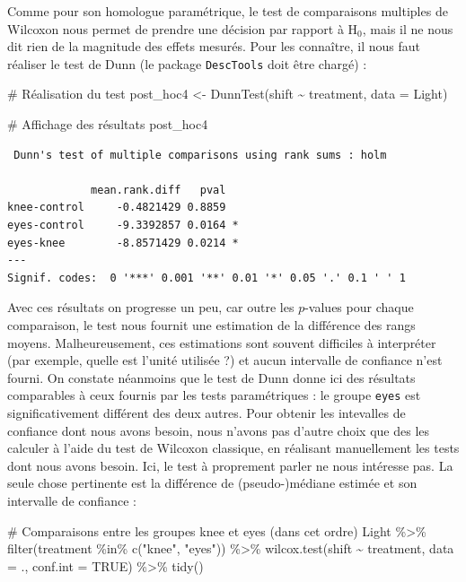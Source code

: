 \documentclass[
  a4paper,
]{article}
\newenvironment{Shaded}{\begin{snugshade}}{\end{snugshade}}
\newcommand{\AttributeTok}[1]{\textcolor[rgb]{0.00,0.34,0.68}{#1}}
\newcommand{\CommentTok}[1]{\textcolor[rgb]{0.54,0.53,0.53}{#1}}
\newcommand{\ConstantTok}[1]{\textcolor[rgb]{0.67,0.33,0.00}{#1}}
\newcommand{\FunctionTok}[1]{\textcolor[rgb]{0.39,0.29,0.61}{#1}}
\newcommand{\NormalTok}[1]{\textcolor[rgb]{0.12,0.11,0.11}{#1}}
\newcommand{\OtherTok}[1]{\textcolor[rgb]{0.00,0.43,0.16}{#1}}
\newcommand{\SpecialCharTok}[1]{\textcolor[rgb]{0.24,0.68,0.91}{#1}}
\newcommand{\StringTok}[1]{\textcolor[rgb]{0.75,0.01,0.01}{#1}}
\begin{document}
Comme pour son homologue paramétrique, le test de comparaisons multiples de Wilcoxon nous permet de prendre une décision par rapport à H\(_0\), mais il ne nous dit rien de la magnitude des effets mesurés. Pour les connaître, il nous faut réaliser le test de Dunn (le package \texttt{DescTools} doit être chargé) :

\begin{Shaded}
\begin{Highlighting}[]
\CommentTok{\# Réalisation du test}
\NormalTok{post\_hoc4 }\OtherTok{\textless{}{-}} \FunctionTok{DunnTest}\NormalTok{(shift }\SpecialCharTok{\textasciitilde{}}\NormalTok{ treatment, }\AttributeTok{data =}\NormalTok{ Light)}

\CommentTok{\# Affichage des résultats}
\NormalTok{post\_hoc4}
\end{Highlighting}
\end{Shaded}

\begin{verbatim}
 Dunn's test of multiple comparisons using rank sums : holm  

             mean.rank.diff   pval    
knee-control     -0.4821429 0.8859    
eyes-control     -9.3392857 0.0164 *  
eyes-knee        -8.8571429 0.0214 *  
---
Signif. codes:  0 '***' 0.001 '**' 0.01 '*' 0.05 '.' 0.1 ' ' 1
\end{verbatim}

Avec ces résultats on progresse un peu, car outre les \(p\)-values pour chaque comparaison, le test nous fournit une estimation de la différence des rangs moyens. Malheureusement, ces estimations sont souvent difficiles à interpréter (par exemple, quelle est l'unité utilisée ?) et aucun intervalle de confiance n'est fourni. On constate néanmoins que le test de Dunn donne ici des résultats comparables à ceux fournis par les tests paramétriques : le groupe \texttt{eyes} est significativement différent des deux autres. Pour obtenir les intevalles de confiance dont nous avons besoin, nous n'avons pas d'autre choix que des les calculer à l'aide du test de Wilcoxon classique, en réalisant manuellement les tests dont nous avons besoin. Ici, le test à proprement parler ne nous intéresse pas. La seule chose pertinente est la différence de (pseudo-)médiane estimée et son intervalle de confiance :

\begin{Shaded}
\begin{Highlighting}[]
\CommentTok{\# Comparaisons entre les groupes \textasciigrave{}knee\textasciigrave{} et \textasciigrave{}eyes\textasciigrave{} (dans cet ordre)}
\NormalTok{Light }\SpecialCharTok{\%\textgreater{}\%} 
  \FunctionTok{filter}\NormalTok{(treatment }\SpecialCharTok{\%in\%} \FunctionTok{c}\NormalTok{(}\StringTok{"knee"}\NormalTok{, }\StringTok{"eyes"}\NormalTok{)) }\SpecialCharTok{\%\textgreater{}\%} 
  \FunctionTok{wilcox.test}\NormalTok{(shift }\SpecialCharTok{\textasciitilde{}}\NormalTok{ treatment, }\AttributeTok{data =}\NormalTok{ ., }\AttributeTok{conf.int =} \ConstantTok{TRUE}\NormalTok{) }\SpecialCharTok{\%\textgreater{}\%} 
  \FunctionTok{tidy}\NormalTok{()}
\end{Highlighting}
\end{Shaded}
\end{document}
